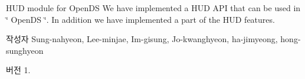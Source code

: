 H\+U\+D module for Open\+D\+S We have implemented a H\+U\+D A\+P\+I that can be used in \char`\"{} Open\+D\+S \char`\"{}. In addition we have implemented a part of the H\+U\+D features. \begin{DoxyAuthor}{작성자}
Sung-\/nahyeon, Lee-\/minjae, Im-\/gisung, Jo-\/kwanghyeon, ha-\/jimyeong, hong-\/sunghyeon 
\end{DoxyAuthor}
\begin{DoxyVersion}{버전}
1. 
\end{DoxyVersion}
